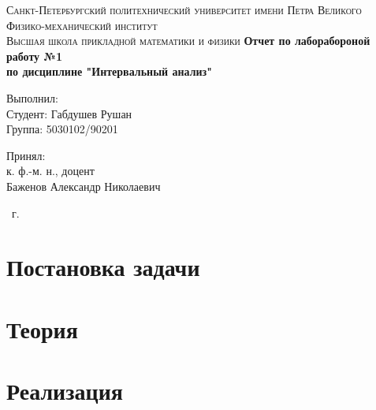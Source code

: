 \documentclass[14pt,a4paper,article]{ncc}
\begin{document}
\begin{titlepage}
    \begin{center}
        \textsc{
            Санкт-Петербургский политехнический университет имени Петра Великого \\[5mm]
            Физико-механический институт\\[2mm]
            Высшая школа прикладной математики и физики            
        }   
        \vfill
        \textbf{\large
            Отчет по лаборабороной работу №1\\
            по дисциплине "Интервальный анализ"\\[3mm]
        }                
    \end{center}

    \vfill
    \hfill
    \begin{minipage}{0.5\textwidth}
        Выполнил: \\[2mm]   
		Студент: Габдушев Рушан \\
		Группа: 5030102/90201\\
    \end{minipage}

	\hfill
	\begin{minipage}{0.5\textwidth}
		Принял: \\[2mm]
		к. ф.-м. н., доцент \\   
		Баженов Александр Николаевич
	\end{minipage}

    \vfill
    \begin{center}
        \theyear\ г.
    \end{center}
\end{titlepage}

\tableofcontents
\newpage
\listoffigures
\newpage
\listoftables
\newpage

\section{Постановка задачи}


\newpage

\section{Теория}

\newpage

\section{Реализация}

\newpage
\end{document}
